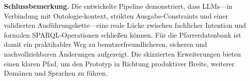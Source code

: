 \bigskip
\noindent\textbf{Schlussbemerkung.} Die entwickelte Pipeline demonstriert, dass LLMs—in Verbindung mit Ontologie-kontext, strikten Ausgabe-Constraints und einer validierten Ausführungskette—eine reale Lücke zwischen fachlicher Intention und formalen SPARQL-Operationen schließen können. Für die Pfarrerdatenbank ist damit ein praktikabler Weg zu benutzerfreundlicheren, sicheren und nachvollziehbaren Änderungen aufgezeigt. Die skizzierten Erweiterungen bieten einen klaren Pfad, um den Prototyp in Richtung produktiver Breite, weiterer Domänen und Sprachen zu führen.


